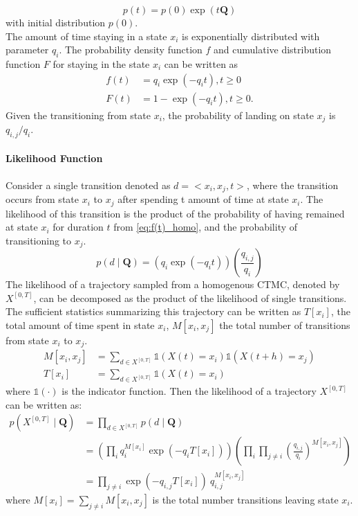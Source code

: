 \begin{equation}
p(t)=p(0) \exp (t\textbf{Q})
\end{equation}
with initial distribution $ p(0) $.\\
The amount of time staying in a state $ x_{i} $ is exponentially distributed with parameter $ q_{i} $. The probability density function $ f $ and cumulative distribution function $ F $ for staying in the state $ x_{i} $ can be written as \cite{Nodelman1995}
\begin{align}
f(t) & = q_{i} \exp \left(-q_{i} t\right), t\geq 0  \label{eq:f(t)_homo}\\
F(t) & = 1 - \exp \left(-q_{i} t\right), t\geq 0 .
\end{align}
Given the transitioning from state $ x_{i} $, the probability of landing on state $ x_{j} $ is $ q_{i,j}/q_{i} $.
\paragraph*{Likelihood Function}
\label{sec:llh_of_homo}
Consider a single transition denoted as $ d = <x_{i},x_{j},t> $, where the transition occurs from state $ x_{i} $ to $ x_{j} $ after spending t amount of time at state $ x_{i} $. The likelihood of this transition is the product of the probability of having remained at state $ x_{i} $ for duration $ t $ from \autoref{eq:f(t)_homo}, and the probability of transitioning to $ x_{j} $.
\begin{equation}
p(d  \mid \textbf{Q}) = \left( q_{i}\exp(-q_{i}t) \right) \left( \frac{q_{i,j}}{q_{i}} \right)
\end{equation}
The likelihood of a trajectory sampled from a homogenous CTMC, denoted by $ X^{[0,T]} $, can be decomposed as the product of the likelihood of single transitions. The sufficient statistics summarizing this trajectory can be written as $ T[x_{i}] $, the total amount of time spent in state $ x_{i} $, $ M[x_{i}, x_{j}] $ the total number of transitions from state $ x_{i} $ to $ x_{j} $. 
\begin{align}
M[x_i,x_j] & = \sum_{d \in X^{[0,T]}} \mathbb{1}(X(t)=x_i)\mathbb{1}(X(t+h)=x_j)\\
T[x_i] &= \sum_{d \in X^{[0,T]}} \mathbb{1}(X(t)=x_i)
\end{align}
where $ \mathbb{1}(\cdot) $ is the indicator function. Then the likelihood of a trajectory $  X^{\left[0,T\right] } $ can be written as:
\begin{align}
p(X^{[0,T]}  \mid \textbf{Q}) &=  \prod_{d \in X^{[0,T]}} p(d \mid \textbf{Q}) \nonumber\\&=\left(\prod_{ i} q_{i}^{M[x_{i}]} \exp \left(-q_{i} T[x_{i}]\right)\right)\left(\prod_{ i} \prod_{ j \neq i} \left(\frac{q_{i,j}}{q_{i}}\right)^{M\left[x_{i}, x_{j}\right]}\right) \nonumber\\ & = \prod_{j \neq i}  \exp(-q_{i,j}T[x_{i}])\ q_{i,j}^{M[x_{i},x_{j}]}
\label{eq:lh_traj_homo}
\end{align}
where $ M[x_{i}] = \sum_{j \neq i} M[x_{i}, x_{j}] $ is the total number transitions leaving state $ x_{i} $.


